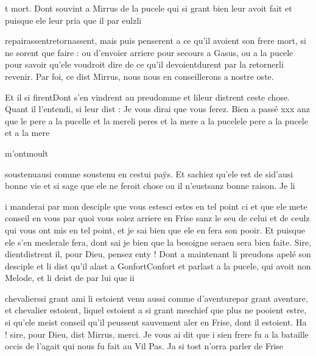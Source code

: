\documentclass{article}
\begin{document}
\begin{pages}
                     t mort. Dont souvint a Mirrus de la pucele qui si grant bien leur avoit fait et 
                  puisque ele leur pria que il par 
                  eulzli
               
                  repairassentretornassent, mais puis penserent a ce qu’il avoient son
                  frere mort, si ne sorent que faire : ou d’envoier arriere pour secours a
                  Gasus, ou a la
                  pucele pour savoir qu’ele voudroit dire de ce qu’il 
                  devoientdurent par 
                  la retornerli revenir. Par foi, ce dist Mirrus, nous nous en conseillerons a nostre oste.
               
                  Et il si firentDont s'en vindrent au preudomme et 
                  lileur distrent ceste chose. Quant il
               l’entendi, si 
                  leur dist : Je vous dirai que vous ferez. Bien a passé xxx anz que 
                     le pere a la pucelle et la mereli peres et la mere a la pucelele pere a la pucele et a la mere
                  
                     m'ontmoult
                  
                     soustenuausi comme soustenu en cestui paÿs. Et sachiez qu’ele est 
                     de sid'ausi bonne vie et si sage que ele ne feroit chose 
                     ou il n’eustsanz bonne raison. Je li 
                     
                     i manderai par mon
                     desciple que vous 
                     estesci estes en tel point ci et que ele mete conseil en vous par quoi vous
                  soiez arriere en Frise sanz le seu 
                     de celui et de ceulz qui vous ont mis en tel point, et je sai bien que ele en fera son
                  pooir. Et puisque ele 
                     s’en meslerale fera, dont sai je bien que la besoigne 
                     seraen sera bien faite.
               Sire, 
                     dientdistrent il, pour Dieu, pensez 
                     enty ! \pend
            \pstart Dont a maintenant li
                  preudons apelé son
                  desciple et li dist qu’il alast a 
                     GonfortConfort et parlast a la pucele, qui avoit non Melode, et li deist de par lui que ii
                  
                     chevalierssi grant ami li estoient venu aussi comme 
                     d’aventurepar grant aventure, et chevalier estoient, 
                     liquel estoient a si grant meschief que plus ne pooient
                        estre, si 
                     qu’ele meist conseil qu’il peussent sauvement aler en Frise, dont il estoient. Ha ! sire, pour Dieu, dist Mirrus, merci. Je
                  vous ai dit que i
                  sien frere fu a la bataille occis de l’agait
                  qui nous fu fait au Vil Pas. Ja si tost
                  n’orra parler de Frise
                  

\end{pages}
\end{document}
